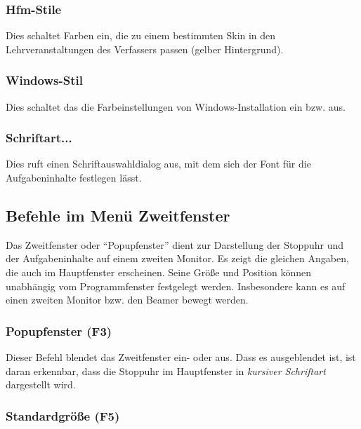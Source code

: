 \documentclass[a4paper,DIV=11
]{scrartcl}
\begin{document}
\hypertarget{hfm-stile}{%
\subsubsection{Hfm-Stile}\label{hfm-stile}}

Dies schaltet Farben ein, die zu einem bestimmten Skin in den
Lehrveranstaltungen des Verfassers passen (gelber Hintergrund).

\hypertarget{windows-stil}{%
\subsubsection{Windows-Stil}\label{windows-stil}}

Dies schaltet das die Farbeinstellungen von Windows-Installation ein
bzw. aus.

\hypertarget{schriftart}{%
\subsubsection{Schriftart...}\label{schriftart}}

Dies ruft einen Schriftauswahldialog aus, mit dem sich der Font für die
Aufgabeninhalte festlegen lässt.

\hypertarget{befehle-im-menuxfc-zweitfenster}{%
\subsection{Befehle im Menü
Zweitfenster}\label{befehle-im-menuxfc-zweitfenster}}

Das Zweitfenster oder "`Popupfenster"' dient zur Darstellung der
Stoppuhr und der Aufgabeninhalte auf einem zweiten Monitor. Es zeigt die
gleichen Angaben, die auch im Hauptfenster erscheinen. Seine Größe und
Position können unabhängig vom Programmfenster festgelegt werden.
Insbesondere kann es auf einen zweiten Monitor bzw. den Beamer bewegt
werden.

\hypertarget{popupfenster-f3}{%
\subsubsection{Popupfenster (F3)}\label{popupfenster-f3}}

Dieser Befehl blendet das Zweitfenster ein- oder aus. Dass es
ausgeblendet ist, ist daran erkennbar, dass die Stoppuhr im Hauptfenster
in \emph{kursiver Schriftart} dargestellt wird.

\hypertarget{standardgruxf6uxdfe-f5}{%
\subsubsection{Standardgröße (F5)}\label{standardgruxf6uxdfe-f5}}
\end{document}
